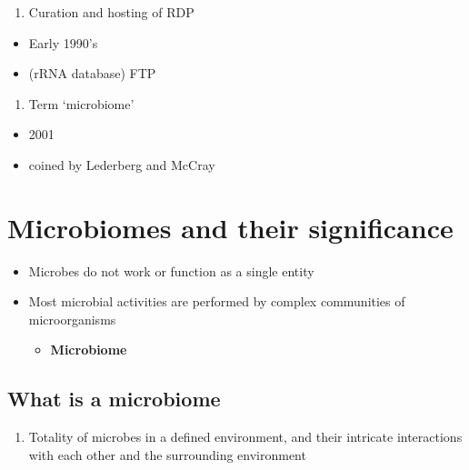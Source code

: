 \documentclass[
]{book}
\providecommand{\tightlist}{%
  \setlength{\itemsep}{0pt}\setlength{\parskip}{0pt}}
\begin{document}
\begin{enumerate}
\def\labelenumi{\arabic{enumi}.}
\setcounter{enumi}{4}
\tightlist
\item
  Curation and hosting of RDP
\end{enumerate}

\begin{itemize}
\tightlist
\item
  Early 1990's
\item
  (rRNA database) FTP
\end{itemize}

\begin{enumerate}
\def\labelenumi{\arabic{enumi}.}
\setcounter{enumi}{5}
\tightlist
\item
  Term `microbiome'
\end{enumerate}

\begin{itemize}
\tightlist
\item
  2001
\item
  coined by Lederberg and McCray
\end{itemize}

\hypertarget{microbiomes-and-their-significance}{%
\section{Microbiomes and their significance}\label{microbiomes-and-their-significance}}

\begin{itemize}
\tightlist
\item
  Microbes do not work or function as a single entity
\item
  Most microbial activities are performed by complex communities of microorganisms

  \begin{itemize}
  \tightlist
  \item
    \textbf{Microbiome}
  \end{itemize}
\end{itemize}

\hypertarget{what-is-a-microbiome}{%
\subsection{What is a microbiome}\label{what-is-a-microbiome}}

\begin{enumerate}
\def\labelenumi{\arabic{enumi}.}
\tightlist
\item
  Totality of microbes in a defined environment, and their intricate interactions with each other and the surrounding environment
\end{enumerate}
\end{document}
